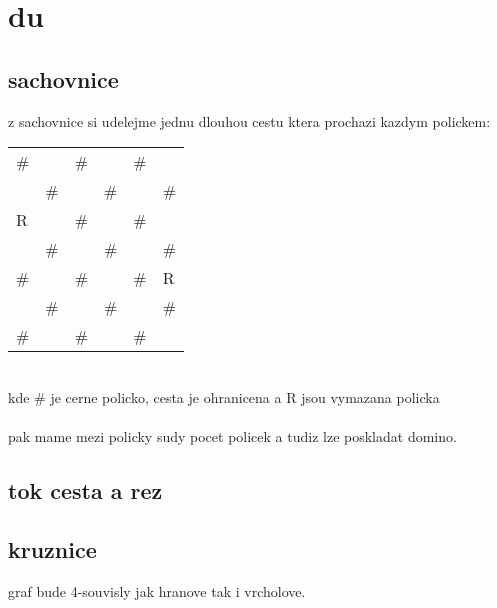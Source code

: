 \documentclass[a4paper]{article}
\begin{document}
\pagestyle{fancy}

\setcounter{section}{2}
\section{du}
\subsection{sachovnice}
z sachovnice si udelejme jednu dlouhou cestu ktera prochazi kazdym polickem:\\
\begin{tabular}{|l|l|l|l|l|l|} 
\hline
\multicolumn{1}{|l}{\#} & \multicolumn{1}{l}{}   & \multicolumn{1}{l}{\#} & \multicolumn{1}{l}{}   & \multicolumn{1}{l}{\#} &     \\ 
\cline{2-5}
                        & \multicolumn{1}{l}{\#} &                        & \multicolumn{1}{l}{\#} &                        & \#  \\
R                       &                        & \#                     &                        & \#                     &     \\
                        & \#                     &                        & \#                     &                        & \#  \\
\#                      &                        & \#                     &                        & \#                     & R   \\
                        & \#                     &                        & \#                     &                        & \#  \\
\multicolumn{1}{|l}{\#} &                        & \multicolumn{1}{l}{\#} &                        & \multicolumn{1}{l}{\#} &     \\
\hline
\end{tabular}\\
kde \# je cerne policko, cesta je ohranicena a R jsou vymazana policka\\
\\
pak mame mezi policky sudy pocet policek a tudiz lze poskladat domino.

\subsection{tok cesta a rez}


\subsection{kruznice}
graf bude 4-souvisly jak hranove tak i vrcholove.
\end{document}
